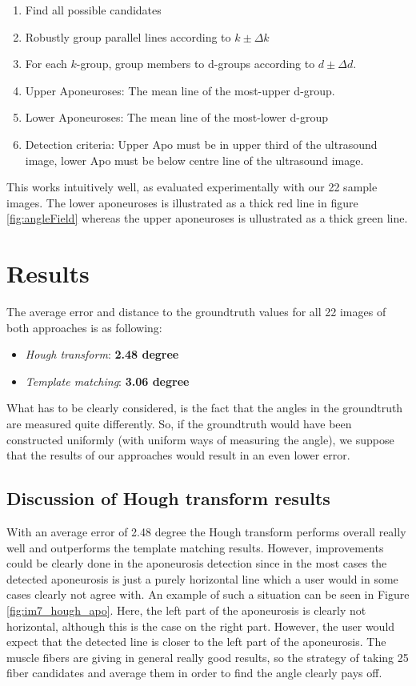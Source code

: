 \documentclass[10pt,twocolumn,letterpaper]{article}
\begin{document}
\begin{enumerate}
	\item Find all possible candidates
	\item Robustly group parallel lines according to $k \pm \Delta k$
	\item For each $k$-group, group members to d-groups according to $d \pm \Delta d$.
	\item Upper Aponeuroses: The mean line of the most-upper d-group.
	\item Lower Aponeuroses: The mean line of the most-lower d-group  
	\item Detection criteria: Upper Apo must be in upper third of the ultrasound image, lower Apo must be below centre line of the ultrasound image. 
\end{enumerate}

This works intuitively well, as evaluated experimentally with our 22 sample images. The lower aponeuroses is illustrated as a thick red line in figure \ref{fig:angleField} whereas the upper aponeuroses is ullustrated as a thick green line.





\section{Results}
The average error and distance to the groundtruth values for all 22 images of both approaches is as following: 

\begin{itemize}
     \item \emph{Hough transform}: \textbf{2.48 degree}
     \item \emph{Template matching}: \textbf{3.06 degree}
\end{itemize}

What has to be clearly considered, is the fact that the angles in the groundtruth are measured quite differently. So, if the groundtruth would have been constructed uniformly (with uniform ways of measuring the angle), we suppose that the results of our approaches would result in an even lower error.


\subsection{Discussion of Hough transform results}

With an average error of 2.48 degree the Hough transform performs overall really well and outperforms the template matching results. 
However, improvements could be clearly done in the aponeurosis detection since in the most cases the detected aponeurosis is just a purely horizontal line which a user would in some cases clearly not agree with. An example of such a situation can be seen in Figure \ref{fig:im7_hough_apo}. Here, the left part of the aponeurosis is clearly not horizontal, although this is the case on the right part. However, the user would expect that the detected line is closer to the left part of the aponeurosis.
The muscle fibers are giving in general really good results, so the strategy of taking 25 fiber candidates and average them in order to find the angle clearly pays off.
\end{document}
